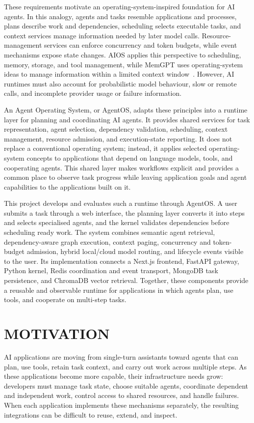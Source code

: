 These requirements motivate an operating-system-inspired foundation for AI agents. In this analogy, agents and tasks resemble applications and processes, plans describe work and dependencies, scheduling selects executable tasks, and context services manage information needed by later model calls. Resource-management services can enforce concurrency and token budgets, while event mechanisms expose state changes. AIOS applies this perspective to scheduling, memory, storage, and tool management, while MemGPT uses operating-system ideas to manage information within a limited context window~\cite{mei2024aios,packer2023memgpt}. However, AI runtimes must also account for probabilistic model behaviour, slow or remote calls, and incomplete provider usage or failure information.

An Agent Operating System, or AgentOS, adapts these principles into a runtime layer for planning and coordinating AI agents. It provides shared services for task representation, agent selection, dependency validation, scheduling, context management, resource admission, and execution-state reporting. It does not replace a conventional operating system; instead, it applies selected operating-system concepts to applications that depend on language models, tools, and cooperating agents. This shared layer makes workflows explicit and provides a common place to observe task progress while leaving application goals and agent capabilities to the applications built on it.

This project develops and evaluates such a runtime through AgentOS. A user submits a task through a web interface, the planning layer converts it into steps and selects specialised agents, and the kernel validates dependencies before scheduling ready work. The system combines semantic agent retrieval, dependency-aware graph execution, context paging, concurrency and token-budget admission, hybrid local/cloud model routing, and lifecycle events visible to the user. Its implementation connects a Next.js frontend, FastAPI gateway, Python kernel, Redis coordination and event transport, MongoDB task persistence, and ChromaDB vector retrieval. Together, these components provide a reusable and observable runtime for applications in which agents plan, use tools, and cooperate on multi-step tasks.

\section{\uppercase{Motivation}}
AI applications are moving from single-turn assistants toward agents that can plan, use tools, retain task context, and carry out work across multiple steps. As these applications become more capable, their infrastructure needs grow: developers must manage task state, choose suitable agents, coordinate dependent and independent work, control access to shared resources, and handle failures. When each application implements these mechanisms separately, the resulting integrations can be difficult to reuse, extend, and inspect.

